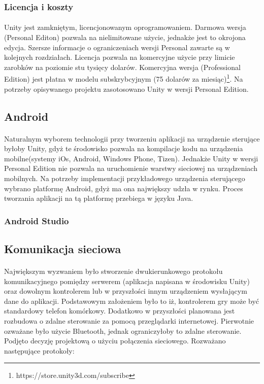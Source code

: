 \documentclass[12pt]{article}
\begin{document}
{\subsubsection{Licencja i koszty}
\paragraph{}
Unity jest zamkniętym, licencjonowanym oprogramowaniem. Darmowa wersja (Personal Editon) pozwala na nielimitowane użycie, jednakże jest to okrojona edycja. Szersze informacje o ograniczeniach wersji Personal zawarte są w kolejnych rozdziałach. Licencja pozwala na komercyjne użycie przy limicie zarobków na poziomie stu tysięcy dolarów.
Komercyjna wersja (Professional Edition) jest płatna w modelu subskrybcyjnym (75 dolarów za miesiąc)\footnote{https://store.unity3d.com/subscribe}.
Na potrzeby opisywanego projektu zasotosowano Unity w wersji Personal Edition.

\subsection{Android}
\paragraph{}
Naturalnym wyborem technologii przy tworzeniu aplikacji na urządzenie sterujące byłoby Unity, gdyż te środowisko pozwala na kompilacje kodu na urządzenia mobilne(systemy iOs, Android, Windows Phone, Tizen). Jednakże Unity w wersji Personal Edition nie pozwala na uruchomienie warstwy sieciowej na urządzeniach mobilnych.
Na potrzeby implementacji przykładowego urządzenia sterującego wybrano platformę Android, gdyż ma ona największy udzła w rynku. Proces tworzania aplikacji na tą platformę przebiega w języku Java.

\subsubsection{Android Studio}

\subsection{Komunikacja sieciowa}
\paragraph{}
Największym wyzwaniem było stworzenie dwukierunkowego protokołu komunikacyjnego pomiędzy serwerem (aplikacja napisana w środowisku Unity) oraz dowolnym kontrolerem lub w przyszłości innym urządzeniem wysłającym dane do aplikacji. Podstawowym założeniem było to iż, kontrolerem gry może być standardowy telefon komórkowy. Dodatkowo w przyszłości planowana jest rozbudowa o zdalne sterowanie za pomocą przeglądarki internetowej. Pierwotnie ozważane było użycie Bluetooth, jednak ograniczyłoby to zdalne sterowanie. Podjęto decyzję projektową o użyciu połączenia sieciowego. Rozważano następujące protokoły:

}
\end{document}
